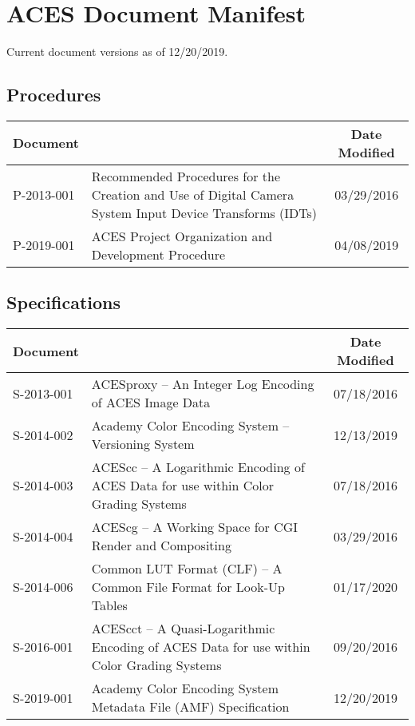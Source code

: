 \documentclass[10pt]{academydoc}
\begin{document}
\regularsectionformat

\section*{ACES Document Manifest}
Current document versions as of 12/20/2019.

\subsection*{Procedures}
\begin{tabularx}{\linewidth}{|l X|c|}
\hline
\textbf{Document} & & \textbf{Date Modified} \\ \hline
P-2013-001 & Recommended Procedures for the Creation and Use of Digital Camera System Input Device Transforms (IDTs) & 03/29/2016 \\ \hline
P-2019-001 & ACES Project Organization and Development Procedure & 04/08/2019 \\ \hline
\end{tabularx}

\subsection*{Specifications}
\begin{tabularx}{\linewidth}{|l X|c|}
\hline
\textbf{Document} & & \textbf{Date Modified} \\ \hline
S-2013-001 & ACESproxy -- An Integer Log Encoding of ACES Image Data & 07/18/2016 \\ \hline
S-2014-002 & Academy Color Encoding System -- Versioning System & 12/13/2019 \\ \hline
S-2014-003 & ACEScc -- A Logarithmic Encoding of ACES Data for use within Color Grading Systems & 07/18/2016 \\ \hline
S-2014-004 & ACEScg -- A Working Space for CGI Render and Compositing & 03/29/2016 \\ \hline
S-2014-006 & Common LUT Format (CLF) -- A Common File Format for Look-Up Tables & 01/17/2020 \\ \hline
S-2016-001 & ACEScct -- A Quasi-Logarithmic Encoding of ACES Data for use within Color Grading Systems & 09/20/2016 \\ \hline
S-2019-001 & Academy Color Encoding System Metadata File (AMF) Specification & 12/20/2019 \\ \hline
\end{tabularx}
\end{document}
